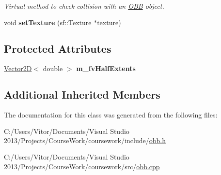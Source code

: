 \begin{DoxyCompactItemize}
\begin{DoxyCompactList}\small\item\em Virtual method to check collision with an \hyperlink{class_o_b_b}{O\+B\+B} object. \end{DoxyCompactList}\item 
\hypertarget{class_o_b_b_a9d0c690a6d3825865b8dd4e023a7cec3}{}void {\bfseries set\+Texture} (sf\+::\+Texture $\ast$texture)\label{class_o_b_b_a9d0c690a6d3825865b8dd4e023a7cec3}

\end{DoxyCompactItemize}
\subsection*{Protected Attributes}
\begin{DoxyCompactItemize}
\item 
\hypertarget{class_o_b_b_a9bb0b948899d85dd6973d7526a574cc2}{}\hyperlink{class_vector2_d}{Vector2\+D}$<$ double $>$ {\bfseries m\+\_\+fv\+Half\+Extents}\label{class_o_b_b_a9bb0b948899d85dd6973d7526a574cc2}

\end{DoxyCompactItemize}
\subsection*{Additional Inherited Members}


The documentation for this class was generated from the following files\+:\begin{DoxyCompactItemize}
\item 
C\+:/\+Users/\+Vitor/\+Documents/\+Visual Studio 2013/\+Projects/\+Course\+Work/coursework/include/\hyperlink{obb_8h}{obb.\+h}\item 
C\+:/\+Users/\+Vitor/\+Documents/\+Visual Studio 2013/\+Projects/\+Course\+Work/coursework/src/\hyperlink{obb_8cpp}{obb.\+cpp}\end{DoxyCompactItemize}
